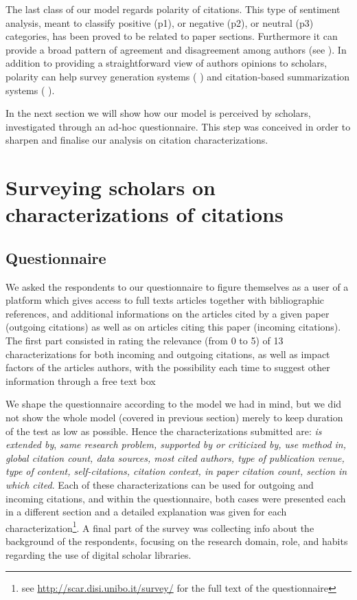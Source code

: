 \documentclass[runningheads,a4paper]{llncs}
\begin{document}
The last class of our model regards polarity of citations. This type of sentiment analysis, meant to classify positive (p1), or negative (p2), or neutral (p3) categories, has been proved to be related to paper sections. Furthermore it can provide a broad pattern of agreement and disagreement among authors (see  \cite{__RefNumPara__4695_348126194}). In addition to providing a straightforward view of authors opinions to scholars, polarity can help survey generation systems ( \cite{__RefNumPara__4709_348126194}) and citation-based summarization systems ( \cite{__RefNumPara__4711_348126194}).

In the next section we will show how our model is perceived by scholars, investigated through an ad-hoc questionnaire. This step was conceived in order to sharpen and finalise our analysis on citation characterizations.

\section{Surveying scholars on characterizations of citations}\label{__RefHeading__183531_27373306210}

\subsection{Questionnaire}

We asked the respondents to our questionnaire to figure themselves as a user of a platform which gives access to full texts articles together with bibliographic references, and additional informations on the articles cited by a given paper (outgoing citations) as well as on articles citing this paper (incoming citations). The first part consisted in rating the relevance (from 0 to 5) of 13 characterizations for both incoming and outgoing citations, as well as impact factors of the articles authors, with the possibility each time to suggest other information through a free text box

We shape the questionnaire according to the model we had in mind, but we did not show the whole model (covered in previous section) merely to keep duration of the test as low as possible. Hence the characterizations submitted are: {\em is extended by}, {\em same research problem, supported by or criticized by, use method in, global citation count, data sources, most cited authors, type of publication venue, type of content, self-citations, citation context, in paper citation count, section in which cited}. Each of these characterizations can be used for outgoing and incoming citations, and within the questionnaire, both cases were presented each in a different section and a detailed explanation was given for each characterization\footnote{see \url{http://scar.disi.unibo.it/survey/} for the full text of the questionnaire}. A final part of the survey was collecting info about the background of the respondents, focusing on the research domain, role, and habits regarding the use of digital scholar libraries.
\end{document}
